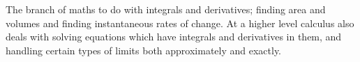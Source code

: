 The branch of maths to do with integrals and derivatives; finding
area and volumes and finding instantaneous rates of change. At a 
higher level calculus also deals with solving equations which 
have integrals and derivatives in them, and handling certain
types of limits both approximately and exactly.